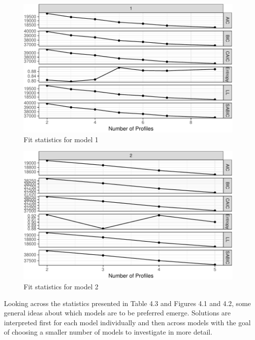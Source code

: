 \documentclass[]{msu-thesis}
\theoremstyle{definition}
\theoremstyle{definition}
\theoremstyle{definition}
\theoremstyle{remark}
\begin{document}
\begin{figure}

{\centering \includegraphics[width=0.6\linewidth]{rosenberg-dissertation_files/figure-latex/model1-1} 

}

\caption{Fit statistics for model 1}\label{fig:model1}
\end{figure}

\begin{figure}

{\centering \includegraphics[width=0.5\linewidth]{rosenberg-dissertation_files/figure-latex/model2-1} 

}

\caption{Fit statistics for model 2}\label{fig:model2}
\end{figure}

Looking across the statistics presented in Table 4.3 and Figures 4.1 and
4.2, some general ideas about which models are to be preferred emerge.
Solutions are interpreted first for each model individually and then
across models with the goal of choosing a smaller number of models to
investigate in more detail.
\end{document}
